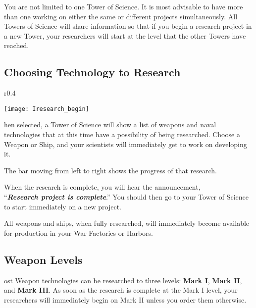 
You are not limited to one Tower of Science. It is most advisable to have more than one working on either the same or different projects simultaneously. All Towers of Science will share information so that if you begin a research project in a new Tower, your researchers will start at the level that the other Towers have reached.

\clearpage

\subsection{Choosing Technology to Research}


\begin{wrapfigure}{r}{0.4\textwidth}
	\vspace{-20pt}
	\begin{center}
		\texttt{[image: Iresearch\_begin]} %
	\end{center}
	\vspace{-20pt}
\end{wrapfigure}

hen selected, a Tower of Science will show a list of weapons and naval technologies that at this time have a possibility of being researched. Choose a Weapon or Ship, and your scientists will immediately get to work on developing it.

The bar moving from left to right shows the progress of that research.

When the research is complete, you will hear the announcement, \\ %
“\textbf{\textit{Research project is complete}}.” You should then go to your Tower of Science to start immediately on a new project.

All weapons and ships, when fully researched, will immediately become available for production in your War Factories or Harbors.

\subsection{Weapon Levels}


ost Weapon technologies can be researched to three levels: \textbf{Mark I}, \textbf{Mark II}, and \textbf{Mark III}. As soon as the research is complete at the Mark I level, your researchers will immediately begin on Mark II unless you order them otherwise.

